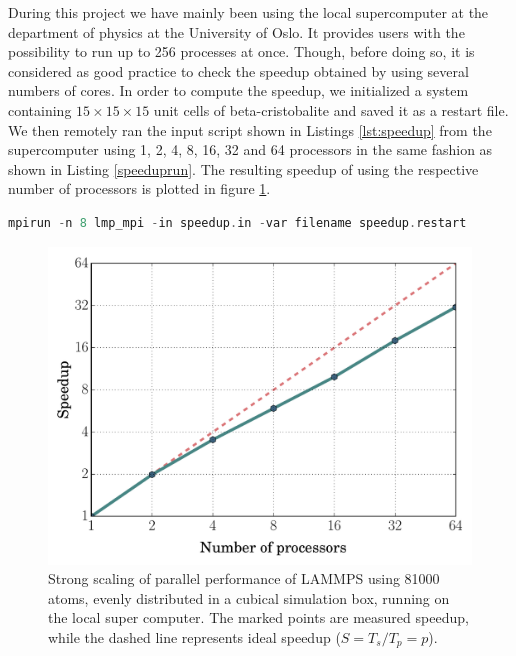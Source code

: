 \documentclass[twoside,english]{uiofysmaster}
\begin{document}
During this project we have mainly been using the local supercomputer at the department of physics at the University of Oslo. It provides users with the possibility to run  up to 256 processes at once. Though, before doing so, it is considered as good practice to check the speedup obtained by using several numbers of cores.
In order to compute the speedup, we initialized a system containing $15\times15\times15$ unit cells of beta-cristobalite and saved it as a restart file. 
We then remotely ran the input script shown in Listings \ref{lst:speedup} from the supercomputer using 1, 2, 4, 8, 16, 32 and 64 processors in the same fashion as shown in Listing \ref{speeduprun}.  
The resulting speedup of using the respective number of processors is plotted in figure \ref{fig:speedup15x15}.



\begin{lstlisting}[caption={Command used to execute the input script speedup.in on 8 parallel processors and set the filename variable to speedup.restart.}, label={speeduprun}, language=c++]
mpirun -n 8 lmp_mpi -in speedup.in -var filename speedup.restart
\end{lstlisting}
\begin{figure}[H]
	\centering
	\includegraphics[width=0.7\linewidth]{figures/speedup/15x15_bigFonts.pdf}
	\caption{Strong scaling of parallel performance of LAMMPS using 81000 atoms, evenly distributed in a cubical simulation box, running on the local super computer. The marked points are measured speedup, while the dashed line represents ideal speedup ($S = T_s/T_p = p$). }
	\label{fig:speedup15x15}
\end{figure}
\end{document}
